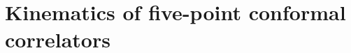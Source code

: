 %
%
%
%
%
%








\section{Kinematics of five-point conformal correlators}
\label{sec:KinematicsFivePointCorrelators}

